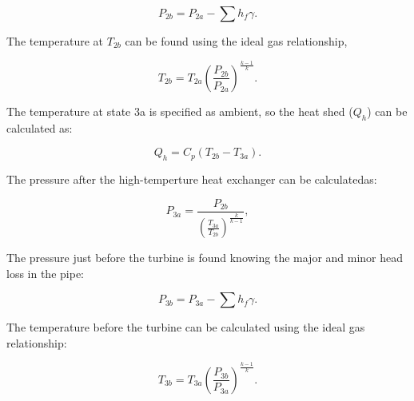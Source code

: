 \documentclass{article}
\begin{document}
\begin{equation}
    P_{2b}=P_{2a}-\sum h_f  \gamma.
\end{equation}

The temperature at $T_{2b}$ can be found using the ideal gas relationship,

\begin{equation}
 T_{2b} = T_{2a} (\frac{P_{2b}}{P_{2a}})^{\frac{k-1}{k}}.
\end{equation}
 
 The temperature at state 3a is specified as ambient, so the heat shed ($Q_h$) can be calculated as:

 \begin{equation}
    Q_h=C_p(T_{2b}-T_{3a}).
\end{equation}

The pressure after the high-temperture heat exchanger can be calculatedas:

\begin{equation}
    P_{3a} = \frac{P_{2b}}{(\frac{T_{3a}}{T_{2b}})^{\frac{k}{k-1}}},
\end{equation}

The pressure just before the turbine is found knowing the major and minor head loss in the pipe:

\begin{equation}
    P_{3b}=P_{3a}-\sum h_f  \gamma.
\end{equation}

The temperature before the turbine can be calculated using the ideal gas relationship:

\begin{equation}
    T_{3b} = T_{3a} (\frac{P_{3b}}{P_{3a}})^{\frac{k-1}{k}}.
\end{equation}





\end{document}

